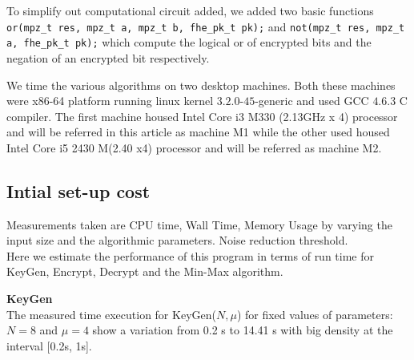 \documentclass{acm_proc_article-sp}
\begin{document}
To simplify out computational circuit added, we added two basic functions \texttt{or(mpz\_t res, mpz\_t a, mpz\_t b, fhe\_pk\_t pk);} and \texttt{not(mpz\_t res, mpz\_t a, fhe\_pk\_t pk);} which compute the logical or of encrypted bits and the negation of an encrypted bit respectively.

We time the various algorithms on two desktop machines. Both these machines were x86-64 platform running linux kernel $3.2.0$-$45$-generic  and used GCC $4.6.3$ C compiler.  The first machine housed Intel Core i3 M330 (2.13GHz x 4) processor and will be referred in this article as machine M1 while the other used  housed Intel Core i5 2430 M(2.40 x4) processor and will be referred as machine M2.
 
\subsection{Intial set-up cost}
Measurements taken are CPU time, Wall Time, Memory Usage by varying the input size  and the algorithmic parameters. Noise reduction threshold.\\
Here we estimate the performance of this program in terms of run time for KeyGen, Encrypt, Decrypt and the Min-Max algorithm.

\textbf{KeyGen}\\
The measured time execution for KeyGen($N, \mu$)  for fixed values of parameters: $N=8$ and $\mu = 4$ show a variation from 0.2 s to 14.41 s with big density at the interval [0.2s, 1s].

\end{document}
